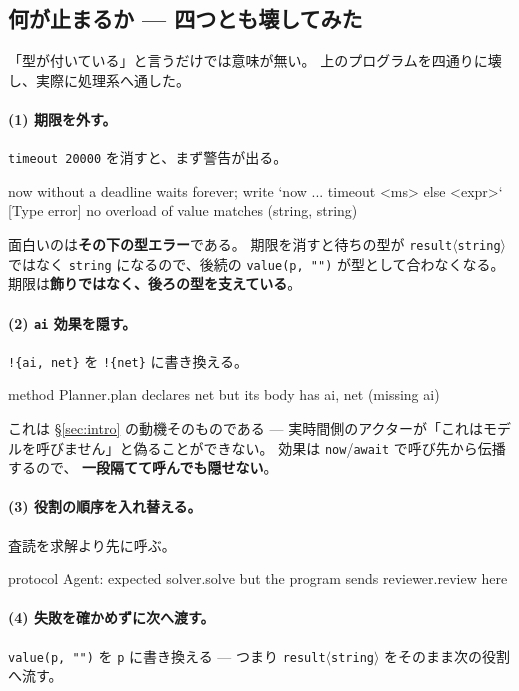 \documentclass[11pt,a4paper]{ltjsarticle}
\theoremstyle{definition}
\theoremstyle{remark}
\begin{document}
\subsection{何が止まるか --- 四つとも壊してみた}

「型が付いている」と言うだけでは意味が無い。
上のプログラムを四通りに壊し、実際に処理系へ通した。

\paragraph{(1) 期限を外す。}
\texttt{timeout 20000} を消すと、まず警告が出る。

\begin{term}
[warn] now without a deadline waits forever;
       write `now ... timeout <ms> else <expr>`
[Type error] no overload of value matches (string, string)
\end{term}

面白いのは\textbf{その下の型エラー}である。
期限を消すと待ちの型が \texttt{result}$\langle$\texttt{string}$\rangle$ ではなく
\texttt{string} になるので、後続の \texttt{value(p, "")} が型として合わなくなる。
期限は\textbf{飾りではなく、後ろの型を支えている}。

\paragraph{(2) \texttt{ai} 効果を隠す。}
\texttt{!\{ai, net\}} を \texttt{!\{net\}} に書き換える。

\begin{term}
 method Planner.plan declares {net} but its body has {ai, net}
             (missing {ai})
\end{term}

これは \S\ref{sec:intro} の動機そのものである ---
実時間側のアクターが「これはモデルを呼びません」と偽ることができない。
効果は \texttt{now}/\texttt{await} で呼び先から伝播するので、
\textbf{一段隔てて呼んでも隠せない}。

\paragraph{(3) 役割の順序を入れ替える。}
査読を求解より先に呼ぶ。

\begin{term}
 protocol Agent: expected solver.solve
             but the program sends reviewer.review here
\end{term}

\paragraph{(4) 失敗を確かめずに次へ渡す。}
\texttt{value(p, "")} を \texttt{p} に書き換える ---
つまり \texttt{result}$\langle$\texttt{string}$\rangle$ をそのまま次の役割へ流す。
\end{document}
